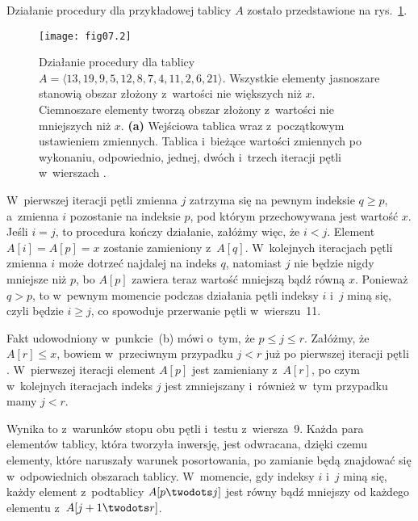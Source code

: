 \problems


\subproblem %
Działanie procedury  dla przykładowej tablicy $A$ zostało przedstawione na rys.~\ref{fig:7-1a}.
\begin{figure}[ht]
	\begin{center}
		\texttt{[image: fig07.2]}
	\end{center}
	\caption{Działanie procedury  dla tablicy $A=\langle13,19,9,5,12,8,7,4,11,2,6,21\rangle$. Wszystkie elementy jasnoszare stanowią obszar złożony z~wartości nie większych niż $x$. Ciemnoszare elementy tworzą obszar złożony z~wartości nie mniejszych niż $x$. {\sffamily\bfseries(a)} Wejściowa tablica wraz z~początkowym ustawieniem zmiennych. {\sffamily\bfseries{}} Tablica i~bieżące wartości zmiennych po wykonaniu, odpowiednio, jednej, dwóch i~trzech iteracji pętli  w~wierszach .} \label{fig:7-1a}
\end{figure}

\subproblem %
W~pierwszej iteracji pętli  zmienna $j$ zatrzyma się na pewnym indeksie $q\ge p$, a~zmienna $i$ pozostanie na indeksie $p$, pod którym przechowywana jest wartość $x$. Jeśli $i=j$, to procedura kończy działanie, załóżmy więc, że $i<j$. Element $A[i]=A[p]=x$ zostanie zamieniony z~$A[q]$. W~kolejnych iteracjach pętli  zmienna $i$ może dotrzeć najdalej na indeks $q$, natomiast $j$ nie będzie nigdy mniejsze niż $p$, bo $A[p]$ zawiera teraz wartość mniejszą bądź równą $x$. Ponieważ $q>p$, to w~pewnym momencie podczas działania pętli indeksy $i$ i~$j$ miną się, czyli będzie $i\ge j$, co spowoduje przerwanie pętli w~wierszu~11.

\subproblem %
Fakt udowodniony w~punkcie~(b) mówi o~tym, że $p\le j\le r$. Załóżmy, że $A[r]\le x$, bowiem w~przeciwnym przypadku $j<r$ już po pierwszej iteracji pętli . W~pierwszej iteracji element $A[p]$ jest zamieniany z~$A[r]$, po czym w~kolejnych iteracjach indeks $j$ jest zmniejszany i~również w~tym przypadku mamy $j<r$.

\subproblem %
Wynika to z~warunków stopu obu pętli  i~testu z~wiersza~9. Każda para elementów tablicy, która tworzyła inwersję, jest odwracana, dzięki czemu elementy, które naruszały warunek posortowania, po zamianie będą znajdować się w~odpowiednich obszarach tablicy. W~momencie, gdy indeksy $i$ i~$j$ miną się, każdy element z~podtablicy $A[p\twodots j]$ jest równy bądź mniejszy od każdego elementu z~$A[j+1\twodots r]$.

